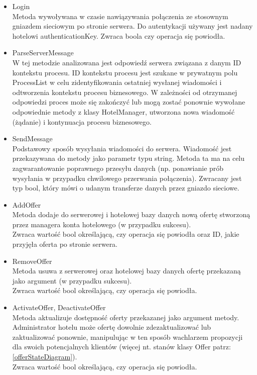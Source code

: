 \documentclass{article}
\begin{document}
\begin{itemize}
    \item Login\\
    Metoda wywoływana w czasie nawiązywania połączenia ze stosownym gniazdem sieciowym po stronie serwera. Do autentykacji używany jest nadany hotelowi authenticationKey. 
    Zwraca boola czy operacja się powiodła.
    \item ParseServerMessage\\
    W tej metodzie analizowana jest odpowiedź serwera związana z danym ID kontekstu procesu. ID kontekstu procesu jest szukane w prywatnym polu ProcessList w celu zidentyfikowania ostatniej wysłanej wiadomości i odtworzenia kontekstu procesu biznesowego. W zależności od otrzymanej odpowiedzi proces może się zakończyć lub mogą zostać ponownie wywołane odpowiednie metody z klasy HotelManager, utworzona nowa wiadomość (żądanie) i kontynuacja procesu biznesowego.
    \item SendMessage\\
    Podstawowy sposób wysyłania wiadomości do serwera. Wiadomość jest przekazywana do metody jako parametr typu string. Metoda ta ma na celu zagwarantowanie poprawnego przesyłu danych (np. ponawianie prób wysyłania w przypadku chwilowego przerwania połączenia). Zwracany jest typ bool, który mówi o udanym transferze danych przez gniazdo sieciowe.
    \item AddOffer\\
    Metoda dodaje do serwerowej i hotelowej bazy danych nową ofertę stworzoną przez managera konta hotelowego (w przypadku sukcesu).\\
    Zwraca wartość bool określającą, czy operacja się powiodła oraz ID, jakie przyjęła oferta po stronie serwera.
    \item RemoveOffer\\
    Metoda usuwa z serwerowej oraz hotelowej bazy danych ofertę przekazaną jako argument (w przypadku sukcesu).\\
    Zwraca wartość bool określającą, czy operacja się powiodła.
    \item ActivateOffer, DeactivateOffer\\
    Metoda aktualizuje dostępność oferty przekazanej jako argument metody. Administrator hotelu może ofertę dowolnie zdezaktualizować lub zaktualizować ponownie, manipulując w ten sposób wachlarzem propozycji dla swoich potencjalnych klientów (więcej nt. stanów klasy Offer patrz: \ref{offerStateDiagram}).\\
    Zwraca wartość bool określającą, czy operacja się powiodła.
\end{itemize}
\end{document}
